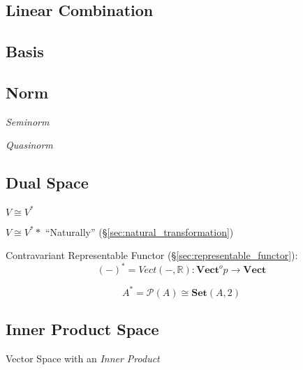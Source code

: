 \subsection{Linear Combination}\label{sec:linear_combination}

\subsection{Basis}\label{sec:basis}

\subsection{Norm}\label{sec:norm}

\emph{Seminorm}

\emph{Quasinorm}



\subsection{Dual Space}\label{sec:dual_space}

$V \cong V^*$

$V \cong V^**$ ``Naturally'' (\S\ref{sec:natural_transformation})

Contravariant Representable Functor
(\S\ref{sec:representable_functor}):
\[
  (-)^* = Vect(-,\mathbb{R}) :
    \mathbf{Vect}^op \rightarrow \mathbf{Vect}
\]

\[
  A^* = \mathcal{P}(A) \cong \mathbf{Set}(A,2)
\]\cite{awodey06}



\subsection{Inner Product Space}\label{sec:innerproduct_space}

Vector Space with an \emph{Inner Product}



